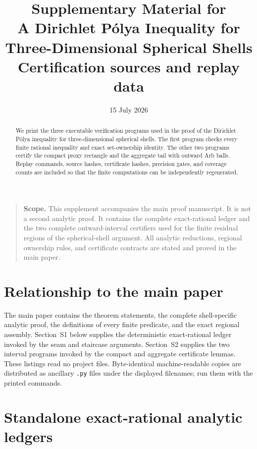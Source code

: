 \documentclass[11pt]{article}
\title{Supplementary Material for\\A Dirichlet P\'olya Inequality for\\Three-Dimensional Spherical Shells\\[0.4em]
\large Certification sources and replay data}
\author{}
\date{15 July 2026}
\numberwithin{equation}{section}
\theoremstyle{definition}
\theoremstyle{remark}
\begin{document}
\maketitle
\thispagestyle{titlepage}

\begin{quote}
\small
\textbf{Scope.}
This supplement accompanies the main proof manuscript.  It is not a second
analytic proof.  It contains the complete exact-rational ledger and the two
complete outward-interval certifiers used for the finite residual regions of
the spherical-shell argument.  All analytic reductions, regional ownership
rules, and certificate contracts are stated and proved in the main paper.
\end{quote}

\begin{abstract}
We print the three executable verification programs used in the proof of the
Dirichlet P\'olya inequality for three-dimensional spherical shells.  The
first program checks every finite rational inequality and exact set-ownership
identity.  The other two programs certify the compact proxy rectangle and the
aggregate tail with outward Arb balls.  Replay commands, source hashes,
certificate hashes, precision gates, and coverage counts are included so that
the finite computations can be independently regenerated.
\end{abstract}

\tableofcontents
\clearpage

\section*{Relationship to the main paper}

The main paper contains the theorem statements, the complete shell-specific
analytic proof, the definitions of every finite predicate, and the exact
regional assembly.  Section~S1 below supplies the deterministic exact-rational
ledger invoked by the seam and staircase arguments.  Section~S2 supplies the
two interval programs invoked by the compact and aggregate certificate
lemmas.  These listings read no project files.  Byte-identical machine-readable
copies are distributed as ancillary \texttt{.py} files under the displayed
filenames; run them with the printed commands.
\section{Standalone exact-rational analytic ledgers}
\label{cm:sec-embedded-analytic-ledgers}
\end{document}
